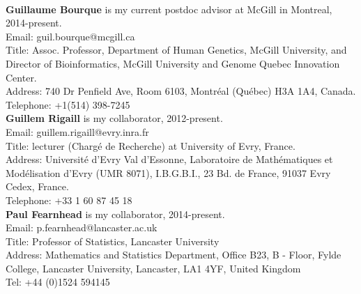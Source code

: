 \documentclass{article}
\begin{document}
\mbox{ }

{\bf Guillaume Bourque} is my current postdoc advisor at McGill in Montreal, 2014-present.\\
Email: guil.bourque@mcgill.ca\\
Title: Assoc. Professor, Department of Human Genetics, McGill University, and\\
Director of Bioinformatics, McGill University and Genome Quebec Innovation Center. \\
Address: 740 Dr Penfield Ave, Room 6103, Montréal (Québec) H3A 1A4, Canada.\\
Telephone: +1(514) 398-7245\\

{\bf Guillem Rigaill} is my collaborator, 2012-present.\\
Email: guillem.rigaill@evry.inra.fr\\
Title: lecturer (Charg\'e de Recherche) at University of Evry, France.\\
Address: Universit\'e d'Evry Val d'Essonne,
Laboratoire de Math\'ematiques et Mod\'elisation d'Evry (UMR 8071),
I.B.G.B.I., 23 Bd. de France, 91037 Evry Cedex,
France.\\
Telephone: +33 1 60 87 45 18\\

{\bf Paul Fearnhead} is my collaborator, 2014-present.\\
Email: p.fearnhead@lancaster.ac.uk\\
Title: Professor of Statistics, Lancaster University\\
Address: Mathematics and Statistics Department,
Office B23, B - Floor, Fylde College,
Lancaster University,
Lancaster, LA1 4YF,
United Kingdom\\
Tel: +44 (0)1524 594145\\



\end{document}
